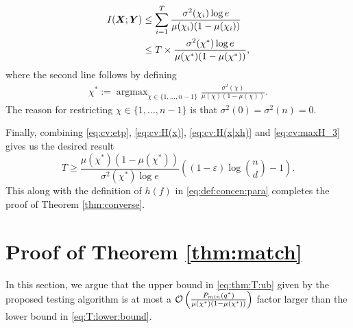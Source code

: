 \documentclass[onecolumn,letterpaper]{IEEEtran}
\DeclareMathOperator*{\argmax}{argmax} %
\newcommand{\cO}{{\cal O}}
\newcommand{\cp}{{q}}
\newcommand{\cpn}{{\cp^*}}
\newcommand{\pminn}{{P_{min}(\cpn)}}
\newcommand{\cx}{{X}}
\newcommand{\cy}{{Y}}
\newcommand{\mi}{{I}}
\newcommand{\plsize}{{\chi}}
\newcommand{\mean}{{\mu}}
\newcommand{\var}{{\sigma^{2}}}
\newcommand{\fh}{{h(f)}}
\begin{document}
\begin{align}
     \mi(\boldsymbol{\cx};\boldsymbol{\cy}) 
    &\leq \sum\limits_{i=1}^{T} \frac{\var(\plsize_i)\log e}{\mean(\plsize_i)(1-\mean(\plsize_i))} \notag\\
    &\leq T \times \frac{\var(\plsize^*) \log e}{\mean(\plsize^*)(1-\mean(\plsize^*))},\label{eq:cv:maxH_3}
\end{align}
where the second line follows by defining
\begin{align} \label{eq:cv:def:X*}
\plsize^*:=\argmax_{\plsize\in \{1,\dots,n-1\}} \frac{\var(\plsize)}{\mean(\plsize)(1-\mean(\plsize))}.
\end{align}
The reason for restricting $\plsize\in \{1,\dots,n-1\}$ is that $\var(0)=\var(n)=0$.


Finally, combining \eqref{eq:cv:etp}, \eqref{eq:cv:H(x)}, \eqref{eq:cv:H(x|xh)} and \eqref{eq:cv:maxH_3}
gives us the desired result
\begin{equation}
\label{eq:cv:lower_bound}
    T \geq \frac{\mean(\plsize^*)\left(1-\mean(\plsize^*)\right)}{\var(\plsize^*) \log e} \left( (1-\varepsilon)\log\binom{n}{d} - 1 \right).
\end{equation}
This along with the definition of $\fh$ in \eqref{eq:def:concen:para} completes the proof of Theorem \ref{thm:converse}. 













\section{Proof of Theorem \ref{thm:match}}
\label{sec:proof:match}
In this section, we argue that the upper bound in \eqref{eq:thm:T:ub} given by the proposed testing algorithm is at most a $\cO\left( \frac{\pminn}{\mean(\plsize^{*}) \left( 1-\mean(\plsize^{*}) \right)} \right)$ factor larger than the lower bound in \eqref{eq:T:lower:bound}.
\end{document}
